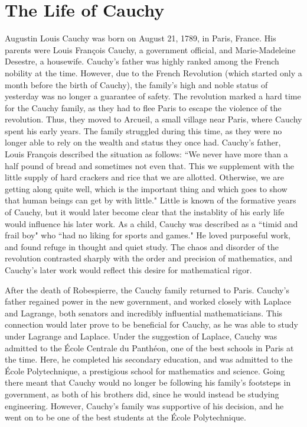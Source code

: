 \documentclass[12pt,letterpaper]{article}
\begin{document}
\section{The Life of Cauchy}
Augustin Louis Cauchy was born on August 21, 1789, in Paris, France.
His parents were Louis François Cauchy, a government official, and Marie-Madeleine Desestre, a housewife.
Cauchy's father was highly ranked among the French nobility at the time.
However, due to the French Revolution (which started only a month before the birth of Cauchy), the family's high and noble status of yesterday was no longer a guarantee of safety.
The revolution marked a hard time for the Cauchy family, as they had to flee Paris to escape the violence of the revolution.
Thus, they moved to Arcueil, a small village near Paris, where Cauchy spent his early years.
The family struggled during this time, as they were no longer able to rely on the wealth and status they once had.
Cauchy's father, Louis François described the situation as follows:
``We never have more than a half pound of bread and sometimes not
even that. This we supplement with the little supply of hard crackers and
rice that we are allotted. Otherwise, we are getting along quite well,
which is the important thing and which goes to show that human beings
can get by with little." \cite{Belhoste1991}
Little is known of the formative years of Cauchy, but it would later become clear that the instablity of his early life would influence his later work.
As a child, Cauchy was described as a ``timid and frail boy" who ``had no liking for sports and games." \cite{Belhoste1991}
He loved purposeful work, and found refuge in thought and quiet study.
The chaos and disorder of the revolution contrasted sharply with the order and precision of mathematics, and Cauchy's later work would reflect this desire for mathematical rigor.

After the death of Robespierre, the Cauchy family returned to Paris.
Cauchy's father regained power in the new government, and worked closely with Laplace and Lagrange, both senators and incredibly influential mathematicians.
This connection would later prove to be beneficial for Cauchy, as he was able to study under Lagrange and Laplace.
Under the suggestion of Laplace, Cauchy was admitted to the École Centrale du Panthéon, one of the best schools in Paris at the time.
Here, he completed his secondary education, and was admitted to the École Polytechnique, a prestigious school for mathematics and science.
Going there meant that Cauchy would no longer be following his family's footsteps in government, as both of his brothers did, since he would instead be studying engineering.
However, Cauchy's family was supportive of his decision, and he went on to be one of the best students at the École Polytechnique.
\end{document}
